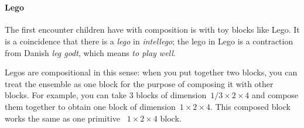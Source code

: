 

\section{}

\paragraph{Lego}

The first encounter children have with composition is with toy blocks like Lego. It is a coincidence that there is a \emph{lego} in \emph{intellego}; the lego in Lego is a contraction from Danish \emph{leg godt}, which means \emph{to play well}.

Legos are compositional in this sense: when you put together two blocks, you can treat the ensemble as one block for the purpose of composing it with other blocks. For example, you can take 3 blocks of dimension~$1/3 \times 2 \times 4$ and compose them together to obtain one block of dimension~$1 \times 2 \times 4$. This composed block works the same as one primitive ~$1 \times 2 \times 4 $ block.

\hfill
{}
\hfill
{}
\hfill


